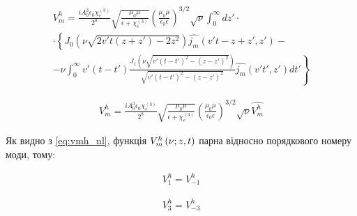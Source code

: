 %
%
\begin{equation} \begin{aligned} \label{eq:vmh_nl}
V_m^h = \frac{i A_0^3 \epsilon_0 \chi_e^{(3)}}{2^8}
\sqrt{\frac{\mu_0 \mu}{\epsilon + \chi_e^{(3)}}} 
\left( \frac{\mu_0 \mu}{\epsilon_0 \epsilon} \right)^{3/2} \sqrt{\nu}
\int_0^\infty dz' \cdot \\ \cdot 
\left\{ J_0 \left( \nu \sqrt{2 v't (z + z') - 2 z^2} \right) 
\hat{j_m} (v't - z + z',z') - \right. \\ 
\left. - \nu \int_0^\infty v'(t-t') 
\frac{J_1 \left( \nu \sqrt{v'(t-t')^2 - (z-z')^2} \right)}
{\sqrt{v'(t-t')^2 - (z-z')^2}} \hat{j_m} (v't',z') dt' \right\}
\end{aligned} \end{equation}

\begin{equation} \begin{aligned} \label{eq:vmh_norm}
V_m^h = \frac{i A_0^3 \epsilon_0 \chi_e^{(3)}}{2^8}
\sqrt{\frac{\mu_0 \mu}{\epsilon + \chi_e^{(3)}}} 
\left( \frac{\mu_0 \mu}{\epsilon_0 \epsilon} \right)^{3/2} 
\sqrt{\nu} \hat{V_m^h}
\end{aligned} \end{equation}

Як видно з \eqref{eq:vmh_nl}, функція $ V_m^h \left( \nu; z, t \right) $ парна відносно 
порядкового номеру моди, тому:

\begin{equation} \begin{aligned} \label{eq:vp1_vm1}
V_1^h = V_{-1}^h
\end{aligned} \end{equation}

\begin{equation} \begin{aligned} \label{eq:vp3_vm3}
V_3^h = V_{-3}^h
\end{aligned} \end{equation}

